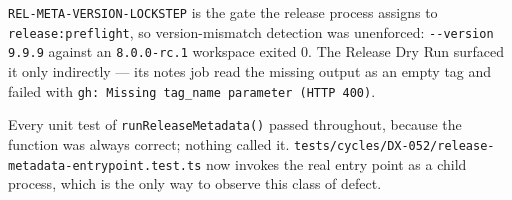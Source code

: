 \begin{enumerate}
  \texttt{R\allowbreak{}E\allowbreak{}L\allowbreak{}-\allowbreak{}M\allowbreak{}E\allowbreak{}T\allowbreak{}A\allowbreak{}-\allowbreak{}V\allowbreak{}E\allowbreak{}R\allowbreak{}S\allowbreak{}I\allowbreak{}O\allowbreak{}N\allowbreak{}-\allowbreak{}L\allowbreak{}O\allowbreak{}C\allowbreak{}K\allowbreak{}S\allowbreak{}T\allowbreak{}E\allowbreak{}P} is the gate the release process assigns to \texttt{r\allowbreak{}e\allowbreak{}l\allowbreak{}e\allowbreak{}a\allowbreak{}s\allowbreak{}e\allowbreak{}:\allowbreak{}p\allowbreak{}r\allowbreak{}e\allowbreak{}f\allowbreak{}l\allowbreak{}i\allowbreak{}g\allowbreak{}h\allowbreak{}t}, so version-mismatch detection was unenforced: \texttt{-\allowbreak{}-\allowbreak{}v\allowbreak{}e\allowbreak{}r\allowbreak{}s\allowbreak{}i\allowbreak{}o\allowbreak{}n\allowbreak{} \allowbreak{}9\allowbreak{}.\allowbreak{}9\allowbreak{}.\allowbreak{}9} against an \texttt{8\allowbreak{}.\allowbreak{}0\allowbreak{}.\allowbreak{}0\allowbreak{}-\allowbreak{}r\allowbreak{}c\allowbreak{}.\allowbreak{}1} workspace exited 0. The Release Dry Run surfaced it only indirectly --- its notes job read the missing output as an empty tag and failed with \texttt{g\allowbreak{}h\allowbreak{}:\allowbreak{} \allowbreak{}M\allowbreak{}i\allowbreak{}s\allowbreak{}s\allowbreak{}i\allowbreak{}n\allowbreak{}g\allowbreak{} \allowbreak{}t\allowbreak{}a\allowbreak{}g\allowbreak{}\_\allowbreak{}n\allowbreak{}a\allowbreak{}m\allowbreak{}e\allowbreak{} \allowbreak{}p\allowbreak{}a\allowbreak{}r\allowbreak{}a\allowbreak{}m\allowbreak{}e\allowbreak{}t\allowbreak{}e\allowbreak{}r\allowbreak{} \allowbreak{}(\allowbreak{}H\allowbreak{}T\allowbreak{}T\allowbreak{}P\allowbreak{} \allowbreak{}4\allowbreak{}0\allowbreak{}0\allowbreak{})}.

  Every unit test of \texttt{r\allowbreak{}u\allowbreak{}n\allowbreak{}R\allowbreak{}e\allowbreak{}l\allowbreak{}e\allowbreak{}a\allowbreak{}s\allowbreak{}e\allowbreak{}M\allowbreak{}e\allowbreak{}t\allowbreak{}a\allowbreak{}d\allowbreak{}a\allowbreak{}t\allowbreak{}a\allowbreak{}(\allowbreak{})} passed throughout, because the function was always correct; nothing called it. \texttt{t\allowbreak{}e\allowbreak{}s\allowbreak{}t\allowbreak{}s\allowbreak{}/\allowbreak{}c\allowbreak{}y\allowbreak{}c\allowbreak{}l\allowbreak{}e\allowbreak{}s\allowbreak{}/\allowbreak{}D\allowbreak{}X\allowbreak{}-\allowbreak{}0\allowbreak{}5\allowbreak{}2\allowbreak{}/\allowbreak{}r\allowbreak{}e\allowbreak{}l\allowbreak{}e\allowbreak{}a\allowbreak{}s\allowbreak{}e\allowbreak{}-\allowbreak{}m\allowbreak{}e\allowbreak{}t\allowbreak{}a\allowbreak{}d\allowbreak{}a\allowbreak{}t\allowbreak{}a\allowbreak{}-\allowbreak{}e\allowbreak{}n\allowbreak{}t\allowbreak{}r\allowbreak{}y\allowbreak{}p\allowbreak{}o\allowbreak{}i\allowbreak{}n\allowbreak{}t\allowbreak{}.\allowbreak{}t\allowbreak{}e\allowbreak{}s\allowbreak{}t\allowbreak{}.\allowbreak{}t\allowbreak{}s} now invokes the real entry point as a child process, which is the only way to observe this class of defect.


\end{enumerate}
